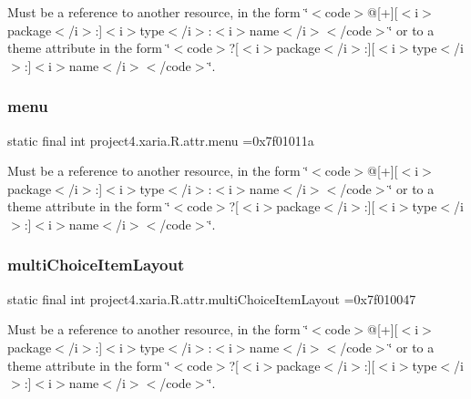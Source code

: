 Must be a reference to another resource, in the form \char`\"{}$<$code$>$@\mbox{[}+\mbox{]}\mbox{[}$<$i$>$package$<$/i$>$\+:\mbox{]}$<$i$>$type$<$/i$>$\+:$<$i$>$name$<$/i$>$$<$/code$>$\char`\"{} or to a theme attribute in the form \char`\"{}$<$code$>$?\mbox{[}$<$i$>$package$<$/i$>$\+:\mbox{]}\mbox{[}$<$i$>$type$<$/i$>$\+:\mbox{]}$<$i$>$name$<$/i$>$$<$/code$>$\char`\"{}. \mbox{\label{classproject4_1_1xaria_1_1R_1_1attr_ab48e686b20977e7b920cdc0975382a27}} 
\subsubsection{\texorpdfstring{menu}{menu}}
{\footnotesize\ttfamily static final int project4.\+xaria.\+R.\+attr.\+menu =0x7f01011a\hspace{0.3cm}{\ttfamily [static]}}

Must be a reference to another resource, in the form \char`\"{}$<$code$>$@\mbox{[}+\mbox{]}\mbox{[}$<$i$>$package$<$/i$>$\+:\mbox{]}$<$i$>$type$<$/i$>$\+:$<$i$>$name$<$/i$>$$<$/code$>$\char`\"{} or to a theme attribute in the form \char`\"{}$<$code$>$?\mbox{[}$<$i$>$package$<$/i$>$\+:\mbox{]}\mbox{[}$<$i$>$type$<$/i$>$\+:\mbox{]}$<$i$>$name$<$/i$>$$<$/code$>$\char`\"{}. \mbox{\label{classproject4_1_1xaria_1_1R_1_1attr_abd6a041162e4073589174b5b4b793b96}} 
\subsubsection{\texorpdfstring{multi\+Choice\+Item\+Layout}{multiChoiceItemLayout}}
{\footnotesize\ttfamily static final int project4.\+xaria.\+R.\+attr.\+multi\+Choice\+Item\+Layout =0x7f010047\hspace{0.3cm}{\ttfamily [static]}}

Must be a reference to another resource, in the form \char`\"{}$<$code$>$@\mbox{[}+\mbox{]}\mbox{[}$<$i$>$package$<$/i$>$\+:\mbox{]}$<$i$>$type$<$/i$>$\+:$<$i$>$name$<$/i$>$$<$/code$>$\char`\"{} or to a theme attribute in the form \char`\"{}$<$code$>$?\mbox{[}$<$i$>$package$<$/i$>$\+:\mbox{]}\mbox{[}$<$i$>$type$<$/i$>$\+:\mbox{]}$<$i$>$name$<$/i$>$$<$/code$>$\char`\"{}. \mbox{\label{classproject4_1_1xaria_1_1R_1_1attr_a3f631916421ac95d60adb2dd40481c57}} 
